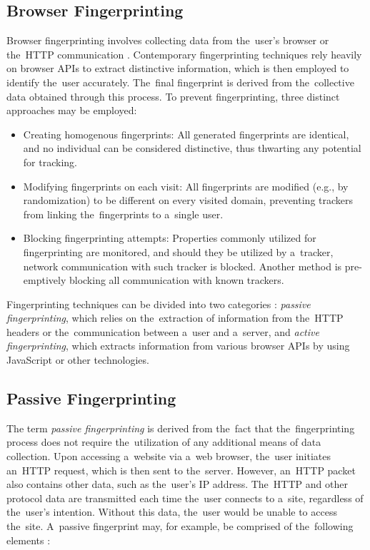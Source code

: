 \subsection{Browser Fingerprinting}
\label{browser-fingerprinting}
Browser fingerprinting involves collecting data from the~user's browser or the~HTTP communication \cite{fingerprinting-survey}. Contemporary fingerprinting techniques rely heavily on browser APIs to extract distinctive information, which is then employed to identify the~user accurately. The~final fingerprint is derived from the~collective data obtained through this process. To prevent fingerprinting, three distinct approaches \cite{jshelter} may be employed: 

\begin{itemize}
    \item Creating homogenous fingerprints: All generated fingerprints are identical, and no individual can be considered distinctive, thus thwarting any potential for tracking.
    \item Modifying fingerprints on each visit: All fingerprints are modified (e.g., by randomization) to be different on every visited domain, preventing trackers from linking the~fingerprints to a~single user.
    \item Blocking fingerprinting attempts: Properties commonly utilized for fingerprinting are monitored, and should they be utilized by a~tracker, network communication with such tracker is blocked. Another method is pre-emptively blocking all communication with known trackers.
\end{itemize}

Fingerprinting techniques can be divided into two categories \cite{jshelter}: \textit{passive fingerprinting}, which relies on the~extraction of information from the~HTTP headers or the~communication between a~user and a~server, and \textit{active fingerprinting}, which extracts information from various browser APIs by using JavaScript or other technologies.

\subsection{Passive Fingerprinting}
The term \emph{passive fingerprinting} is derived from the~fact that the~fingerprinting process does not require the~utilization of any additional means of data collection. Upon accessing a~website via a~web browser, the~user initiates an~HTTP request, which is then sent to the~server. However, an~HTTP packet also contains other data, such as the~user's IP address. The~HTTP and other protocol data are transmitted each time the~user connects to a~site, regardless of the~user's intention. Without this data, the~user would be unable to access the~site. A~passive fingerprint may, for example, be comprised of the~following elements \cite{fingerprinting-survey, fingerprinting-survey-2}:

